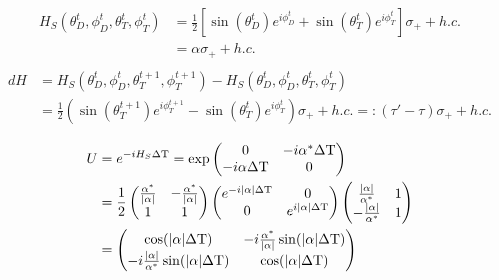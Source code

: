 \label{deriv_jump}
\begin{align*}
	H_S(\theta_D^t, \phi_D^t, \theta_T^t, \phi_T^t) & = \frac{1}{2} \left[\sin(\theta_D^t) e^{i\phi_D^t} + \sin(\theta_T^t) e^{i\phi_T^t}\right] \sigma_{+} + h.c. \\
	& = \alpha \sigma_{+} + h.c. \\
\end{align*}
\begin{align*}
	dH & = H_S(\theta_D^t, \phi_D^t, \theta_T^{t+1}, \phi_T^{t+1}) - H_S(\theta_D^t, \phi_D^t, \theta_T^t, \phi_T^t) \\
	& = \frac{1}{2}(\sin(\theta_T^{t+1})e^{i\phi_T^{t+1}} - \sin(\theta_T^t)e^{i\phi_T^t}) \sigma_{+} + h.c. =: (\tau' - \tau) \sigma_{+} + h.c. \\
\end{align*}
\begin{align*}
	U & = e^{-iH_S \Delta \mathrm{T}} = 
	\exp \begin{pmatrix}
	0 & -i\alpha^* \Delta \mathrm{T} \\
	-i \alpha \Delta \mathrm{T} & 0 \\
	\end{pmatrix}\\
	& = 
	\frac{1}{2} \begin{pmatrix}
	\frac{\alpha^*}{\abs{\alpha}} & -\frac{\alpha^*}{\abs{\alpha}} \\
	1 & 1 \\
	\end{pmatrix}
	\begin{pmatrix}
	e^{-i\abs{\alpha} \Delta \mathrm{T}} & 0 \\
	0 & e^{i\abs{\alpha} \Delta \mathrm{T}} \\
	\end{pmatrix}
	\begin{pmatrix}
	\frac{\abs{\alpha}}{\alpha^*} & 1 \\
	-\frac{\abs{\alpha}}{\alpha^*} & 1 \\
	\end{pmatrix} \\
	& = \begin{pmatrix}
	\cos(\abs{\alpha}\Delta \mathrm{T}) & -i\frac{\alpha^*}{\abs{\alpha}} \sin(\abs{\alpha}\Delta \mathrm{T}) \\
	-i\frac{\abs{\alpha}}{\alpha^*} \sin(\abs{\alpha}\Delta \mathrm{T}) & \cos(\abs{\alpha} \Delta \mathrm{T}) \\
	\end{pmatrix} \\
\end{align*}
